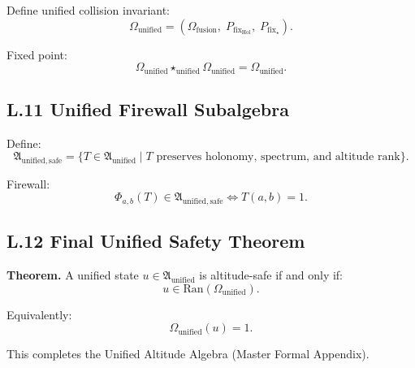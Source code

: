 Define unified collision invariant:
\[
\Omega_{\mathrm{unified}} =
(\Omega_{\mathrm{fusion}},\;
P_{\mathrm{fix}_{\mathrm{Hol}}},\;
P_{\mathrm{fix}_{\star}}).
\]

Fixed point:
\[
\Omega_{\mathrm{unified}}
\star_{\mathrm{unified}}
\Omega_{\mathrm{unified}}
=
\Omega_{\mathrm{unified}}.
\]

\subsection*{L.11 Unified Firewall Subalgebra}

Define:
\[
\mathfrak{A}_{\mathrm{unified,safe}}
=
\{ T \in \mathfrak{A}_{\mathrm{unified}}
\mid
T \text{ preserves holonomy, spectrum, and altitude rank} \}.
\]

Firewall:
\[
\Phi_{a,b}(T) \in \mathfrak{A}_{\mathrm{unified,safe}}
\iff
T(a,b)=1.
\]

\subsection*{L.12 Final Unified Safety Theorem}

\textbf{Theorem.}  
A unified state $u \in \mathfrak{A}_{\mathrm{unified}}$ is altitude-safe if and only if:
\[
u \in \mathrm{Ran}(\Omega_{\mathrm{unified}}).
\]

Equivalently:
\[
\Omega_{\mathrm{unified}}(u)=1.
\]

This completes the Unified Altitude Algebra (Master Formal Appendix).
